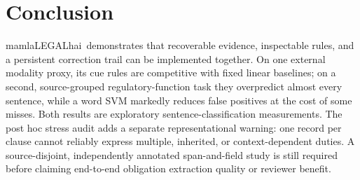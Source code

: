 \documentclass[11pt,a4paper]{article}
\newcommand{\system}{\textsf{mamlaLEGALhai}}
\begin{document}
\section{Conclusion}
\system\ demonstrates that recoverable evidence, inspectable rules, and a persistent correction trail can be implemented together. On one external modality proxy, its cue rules are competitive with fixed linear baselines; on a second, source-grouped regulatory-function task they overpredict almost every sentence, while a word SVM markedly reduces false positives at the cost of some misses. Both results are exploratory sentence-classification measurements. The post hoc stress audit adds a separate representational warning: one record per clause cannot reliably express multiple, inherited, or context-dependent duties. A source-disjoint, independently annotated span-and-field study is still required before claiming end-to-end obligation extraction quality or reviewer benefit.
\end{document}
